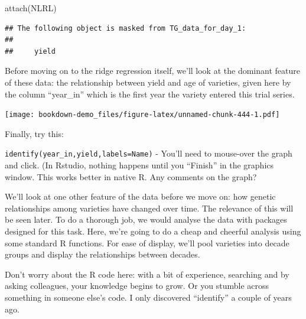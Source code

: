 \documentclass[
]{book}
\newenvironment{Shaded}{\begin{snugshade}}{\end{snugshade}}
\newcommand{\CommentTok}[1]{\textcolor[rgb]{0.56,0.35,0.01}{\textit{#1}}}
\newcommand{\FunctionTok}[1]{\textcolor[rgb]{0.00,0.00,0.00}{#1}}
\newcommand{\NormalTok}[1]{#1}
\newcommand{\SpecialCharTok}[1]{\textcolor[rgb]{0.00,0.00,0.00}{#1}}
\begin{document}
\begin{Shaded}
\begin{Highlighting}[]
\FunctionTok{attach}\NormalTok{(NLRL)}
\end{Highlighting}
\end{Shaded}

\begin{verbatim}
## The following object is masked from TG_data_for_day_1:
## 
##     yield
\end{verbatim}

Before moving on to the ridge regression itself, we'll look at the dominant feature of these data: the relationship between yield and age of varieties, given here by the column ``year\_in'' which is the first year the variety entered this trial series.

\begin{Shaded}
\end{Shaded}

\texttt{[image: bookdown-demo\_files/figure-latex/unnamed-chunk-444-1.pdf]}

Finally, try this:

\texttt{identify(year\_in,yield,labels=Name)} - You'll need to mouse-over the graph and click. (In Rstudio, nothing happens until you ``Finish'' in the graphics window. This works better in native R. Any comments on the graph?

We'll look at one other feature of the data before we move on: how genetic relationships
among varieties have changed over time. The relevance of this will be seen later. To do a thorough job, we would analyse the data with packages designed for this task. Here, we're going to do a cheap and cheerful analysis using some standard R functions. For ease of
display, we'll pool varieties into decade groups and display the relationships between
decades.

Don't worry about the R code here: with a bit of experience, searching and by asking
colleagues, your knowledge begins to grow. Or you stumble across something in someone else's code. I only discovered ``identify'' a couple of years ago.
\end{document}
